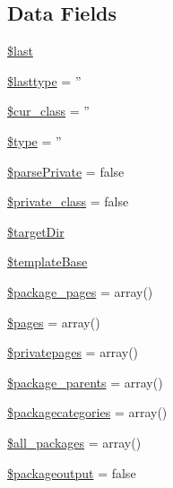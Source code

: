 \subsection*{\-Data \-Fields}
\begin{DoxyCompactItemize}
\item 
\hyperlink{classphp_documentor___intermediate_parser_acf48db609a946d13953d8060363fd1d3}{\$last}
\item 
\hyperlink{classphp_documentor___intermediate_parser_a8fdfcc403cbf8d9b819dc762793d290a}{\$lasttype} = ''
\item 
\hyperlink{classphp_documentor___intermediate_parser_a5df82a7ff1e832b9b840f591e38533c4}{\$cur\-\_\-class} = ''
\item 
\hyperlink{classphp_documentor___intermediate_parser_a9a4a6fba2208984cabb3afacadf33919}{\$type} = ''
\item 
\hyperlink{classphp_documentor___intermediate_parser_a351b7c7ced5d5cd6ce87029cca64d150}{\$parse\-Private} = false
\item 
\hyperlink{classphp_documentor___intermediate_parser_a91bc6a84d69355cf5bf3fcae3d97df26}{\$private\-\_\-class} = false
\item 
\hyperlink{classphp_documentor___intermediate_parser_aae33ae3051c6f350bb69a0631ade81d9}{\$target\-Dir}
\item 
\hyperlink{classphp_documentor___intermediate_parser_ac13127aa22e272d4a47bc7577d7f4b2a}{\$template\-Base}
\item 
\hyperlink{classphp_documentor___intermediate_parser_acb916db0304b969918dbc0de762d45e0}{\$package\-\_\-pages} = array()
\item 
\hyperlink{classphp_documentor___intermediate_parser_a263621399c53f2952c2329ee13ad8e4e}{\$pages} = array()
\item 
\hyperlink{classphp_documentor___intermediate_parser_aca2dbbdf74f1847e4e2be72be9f5130e}{\$privatepages} = array()
\item 
\hyperlink{classphp_documentor___intermediate_parser_acf9ccb8aea606d86cfed6693a6349bc3}{\$package\-\_\-parents} = array()
\item 
\hyperlink{classphp_documentor___intermediate_parser_ad46f1d4e924726751a32d205f64ccd80}{\$packagecategories} = array()
\item 
\hyperlink{classphp_documentor___intermediate_parser_a2239e82b48c3085715b2bade1d08779c}{\$all\-\_\-packages} = array()
\item 
\hyperlink{classphp_documentor___intermediate_parser_ae42e8e1aebbb7e9af6f8b463703e90a0}{\$packageoutput} = false

\end{DoxyCompactItemize}
